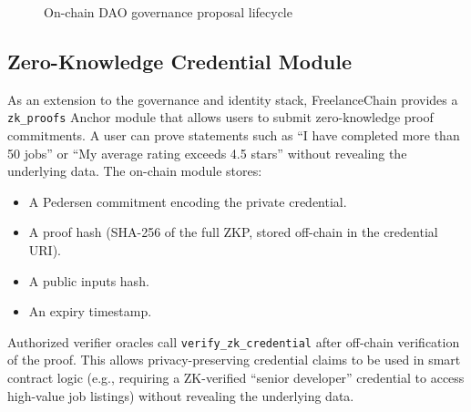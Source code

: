 \begin{figure}[H]
    \centering
    \caption{On-chain DAO governance proposal lifecycle}
    \label{fig:governance_lifecycle}
\end{figure}

\subsection{Zero-Knowledge Credential Module}

As an extension to the governance and identity stack, FreelanceChain provides a \texttt{zk\_proofs} Anchor module that allows users to submit zero-knowledge proof commitments. A user can prove statements such as ``I have completed more than 50 jobs'' or ``My average rating exceeds 4.5 stars'' without revealing the underlying data. The on-chain module stores:
\begin{itemize}
    \item A Pedersen commitment encoding the private credential.
    \item A proof hash (SHA-256 of the full ZKP, stored off-chain in the credential URI).
    \item A public inputs hash.
    \item An expiry timestamp.
\end{itemize}

Authorized verifier oracles call \texttt{verify\_zk\_credential} after off-chain verification of the proof. This allows privacy-preserving credential claims to be used in smart contract logic (e.g., requiring a ZK-verified ``senior developer'' credential to access high-value job listings) without revealing the underlying data.

